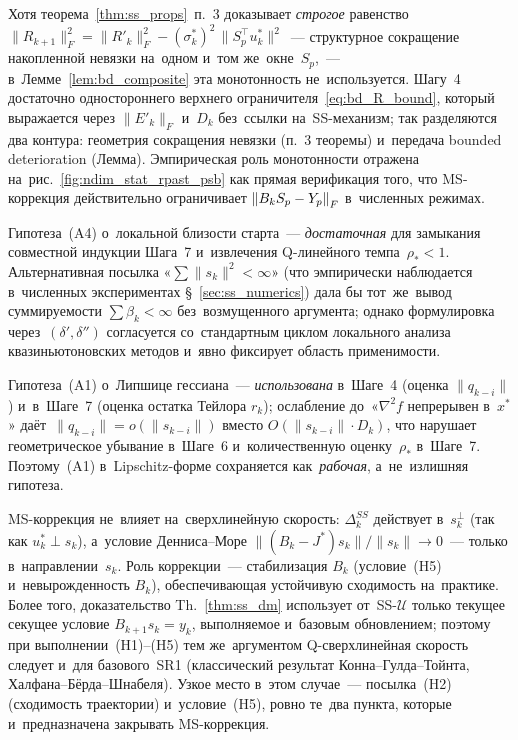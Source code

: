 \begin{remark}\label{rem:bd_to_rpast}
Хотя теорема~\ref{thm:ss_props}~п.~3 доказывает \emph{строгое} равенство
$\|R_{k+1}\|_F^2 = \|R'_k\|_F^2 - (\sigma_k^*)^2\,\|S_p^\top u_k^*\|^2$~--- структурное
сокращение накопленной невязки на~одном и~том же~окне~$S_p$,~--- в~Лемме~\ref{lem:bd_composite}
эта монотонность не~используется. Шагу~4 достаточно одностороннего верхнего
ограничителя~\eqref{eq:bd_R_bound}, который выражается через $\|E'_k\|_F$ и~$D_k$
без~ссылки на~SS-механизм; так разделяются два контура: геометрия сокращения
невязки (п.~3 теоремы) и~передача bounded deterioration (Лемма).
Эмпирическая роль монотонности отражена на~рис.~\ref{fig:ndim_stat_rpast_psb}
как прямая верификация того, что MS-коррекция действительно ограничивает
$\left\|B_k S_p - Y_p\right\|_F$ в~численных режимах.
\end{remark}


\begin{remark}\label{rem:bd_minimality}
Гипотеза~(A4) о~локальной близости старта~--- \emph{достаточная} для
замыкания совместной индукции Шага~7 и~извлечения Q-линейного темпа~$\rho_*<1$.
Альтернативная посылка «$\sum\|s_k\|^2<\infty$» (что эмпирически наблюдается
в~численных экспериментах §~\ref{sec:ss_numerics}) дала бы тот~же~вывод
суммируемости $\sum\beta_k<\infty$ без~возмущенного аргумента; однако
формулировка через~$(\delta',\delta'')$ согласуется со~стандартным циклом
локального анализа квазиньютоновских методов и~явно фиксирует область применимости.

Гипотеза~(A1) о~Липшице гессиана~--- \emph{использована} в~Шаге~4
(оценка $\|q_{k-i}\|$) и~в~Шаге~7 (оценка остатка Тейлора $r_k$);
ослабление до~«$\nabla^2 f$ непрерывен в~$x^{*}$» даёт~$\|q_{k-i}\|=o(\|s_{k-i}\|)$
вместо $O(\|s_{k-i}\|\cdot D_k)$, что нарушает геометрическое убывание в~Шаге~6
и~количественную оценку~$\rho_*$ в~Шаге~7. Поэтому~(A1) в~Lipschitz-форме
сохраняется как~\emph{рабочая}, а~не~излишняя гипотеза.
\end{remark}

\begin{remark}\label{rem:ss-rate-invariance}
MS-коррекция не~влияет на~сверхлинейную скорость: $\Delta_k^{SS}$ действует
в~$s_k^\perp$ (так как $u_k^*\perp s_k$), а~условие Денниса--Море
$\|(B_k-J^*)s_k\|/\|s_k\|\to 0$~--- только в~направлении~$s_k$. Роль
коррекции~--- стабилизация $B_k$ (условие~(H5) и~невырожденность $B_k$),
обеспечивающая устойчивую сходимость на~практике. Более того, доказательство
Th.~\ref{thm:ss_dm} использует от~SS-$\mathcal{U}$ только текущее секущее
условие $B_{k+1}s_k=y_k$, выполняемое и~базовым обновлением; поэтому
при выполнении~(H1)--(H5) тем же~аргументом Q-сверхлинейная скорость
следует и~для базового~SR1 (классический результат Конна--Гулда--Тойнта,
Халфана--Бёрда--Шнабеля). Узкое место в~этом случае~--- посылка~(H2)
(сходимость траектории) и~условие~(H5), ровно те~два пункта,
которые и~предназначена закрывать MS-коррекция.
\end{remark}

